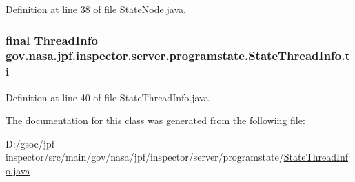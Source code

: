 Definition at line 38 of file State\+Node.\+java.

\subsubsection[{\texorpdfstring{ti}{ti}}]{\setlength{\rightskip}{0pt plus 5cm}final Thread\+Info gov.\+nasa.\+jpf.\+inspector.\+server.\+programstate.\+State\+Thread\+Info.\+ti\hspace{0.3cm}{\ttfamily [protected]}}\hypertarget{classgov_1_1nasa_1_1jpf_1_1inspector_1_1server_1_1programstate_1_1_state_thread_info_a62ec5520eec2d112a5669f0b845bf915}{}\label{classgov_1_1nasa_1_1jpf_1_1inspector_1_1server_1_1programstate_1_1_state_thread_info_a62ec5520eec2d112a5669f0b845bf915}


Definition at line 40 of file State\+Thread\+Info.\+java.



The documentation for this class was generated from the following file\+:\begin{DoxyCompactItemize}
\item 
D\+:/gsoc/jpf-\/inspector/src/main/gov/nasa/jpf/inspector/server/programstate/\hyperlink{_state_thread_info_8java}{State\+Thread\+Info.\+java}\end{DoxyCompactItemize}
